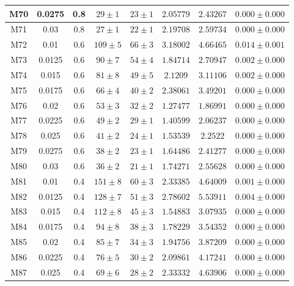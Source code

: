 \documentclass[12pt,a4paper]{report}
\begin{document}
\begin{center}
\begin{longtable}{||c|c|c|c|c|c|c|c||}
M70 & 0.0275 & 0.8 & $ 29 \pm 1 $ & $ 23 \pm 1 $ & $ 2.05779 $ & $ 2.43267 $ & $ 0.000 \pm 0.000 $ \\ \hline
M71 & 0.03 & 0.8 & $ 27 \pm 1 $ & $ 22 \pm 1 $ & $ 2.19708 $ & $ 2.59734 $ & $ 0.000 \pm 0.000 $ \\ \hline
M72 & 0.01 & 0.6 & $ 109 \pm 5 $ & $ 66 \pm 3 $ & $ 3.18002 $ & $ 4.66465 $ & $ 0.014 \pm 0.001 $ \\ \hline
M73 & 0.0125 & 0.6 & $ 90 \pm 7 $ & $ 54 \pm 4 $ & $ 1.84714 $ & $ 2.70947 $ & $ 0.002 \pm 0.000 $ \\ \hline
M74 & 0.015 & 0.6 & $ 81 \pm 8 $ & $ 49 \pm 5 $ & $ 2.1209 $ & $ 3.11106 $ & $ 0.002 \pm 0.000 $ \\ \hline
M75 & 0.0175 & 0.6 & $ 66 \pm 4 $ & $ 40 \pm 2 $ & $ 2.38061 $ & $ 3.49201 $ & $ 0.000 \pm 0.000 $ \\ \hline
M76 & 0.02 & 0.6 & $ 53 \pm 3 $ & $ 32 \pm 2 $ & $ 1.27477 $ & $ 1.86991 $ & $ 0.000 \pm 0.000 $ \\ \hline
M77 & 0.0225 & 0.6 & $ 49 \pm 2 $ & $ 29 \pm 1 $ & $ 1.40599 $ & $ 2.06237 $ & $ 0.000 \pm 0.000 $ \\ \hline
M78 & 0.025 & 0.6 & $ 41 \pm 2 $ & $ 24 \pm 1 $ & $ 1.53539 $ & $ 2.2522 $ & $ 0.000 \pm 0.000 $ \\ \hline
M79 & 0.0275 & 0.6 & $ 38 \pm 2 $ & $ 23 \pm 1 $ & $ 1.64486 $ & $ 2.41277 $ & $ 0.000 \pm 0.000 $ \\ \hline
M80 & 0.03 & 0.6 & $ 36 \pm 2 $ & $ 21 \pm 1 $ & $ 1.74271 $ & $ 2.55628 $ & $ 0.000 \pm 0.000 $ \\ \hline
M81 & 0.01 & 0.4 & $ 151 \pm 8 $ & $ 60 \pm 3 $ & $ 2.33385 $ & $ 4.64009 $ & $ 0.001 \pm 0.000 $ \\ \hline
M82 & 0.0125 & 0.4 & $ 128 \pm 7 $ & $ 51 \pm 3 $ & $ 2.78602 $ & $ 5.53911 $ & $ 0.004 \pm 0.000 $ \\ \hline
M83 & 0.015 & 0.4 & $ 112 \pm 8 $ & $ 45 \pm 3 $ & $ 1.54883 $ & $ 3.07935 $ & $ 0.000 \pm 0.000 $ \\ \hline
M84 & 0.0175 & 0.4 & $ 94 \pm 8 $ & $ 38 \pm 3 $ & $ 1.78229 $ & $ 3.54352 $ & $ 0.000 \pm 0.000 $ \\ \hline
M85 & 0.02 & 0.4 & $ 85 \pm 7 $ & $ 34 \pm 3 $ & $ 1.94756 $ & $ 3.87209 $ & $ 0.000 \pm 0.000 $ \\ \hline
M86 & 0.0225 & 0.4 & $ 76 \pm 5 $ & $ 30 \pm 2 $ & $ 2.09861 $ & $ 4.17241 $ & $ 0.000 \pm 0.000 $ \\ \hline
M87 & 0.025 & 0.4 & $ 69 \pm 6 $ & $ 28 \pm 2 $ & $ 2.33332 $ & $ 4.63906 $ & $ 0.000 \pm 0.000 $ \\ \hline

\end{longtable}
\end{center}
\end{document}
